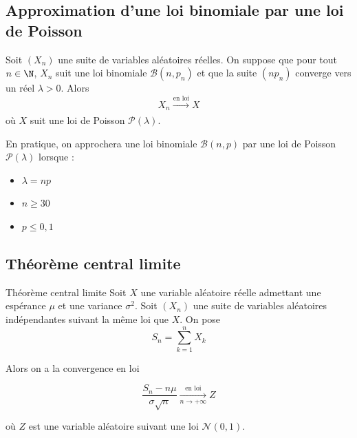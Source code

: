 \subsection{Approximation d'une loi binomiale par une loi de Poisson}
		
\begin{proposition}{}{}
			Soit $(X_n)$ une suite de variables aléatoires réelles. On suppose que pour tout $n \in \N $, $X_n$ suit une loi binomiale $\mathcal{B}(n,p_n)$ et que la suite $(np_n)$ converge vers un réel $\lambda >0$. Alors $$ X_n \xrightarrow[]{\text{en loi}}X $$ où  $X$ suit une loi de Poisson $\mathcal{P}(\lambda)$.
\end{proposition}
		
		En pratique, on approchera une loi binomiale  $\mathcal{B}(n,p)$ par une loi de Poisson $\mathcal{P}(\lambda)$ lorsque :
		
		\begin{itemize}
			\item $\lambda = np$
			\item $n \geq 30$
			\item $p \leq 0{,}1$
		\end{itemize}
		

		
		
\subsection{Théorème central limite}
		
\begin{theoreme}{Théorème central limite}{}
			Soit $X$ une variable aléatoire réelle admettant une espérance $\mu$ et une variance $\sigma^2$. Soit $(X_n)$ une suite de variables aléatoires indépendantes suivant la même loi que $X$. On pose 
			$$S_n=\sum_{k=1}^n X_k$$
			
			Alors on a la convergence en loi 
			
			$$\frac{S_n-n\mu}{\sigma \sqrt{n}}  \xrightarrow[n \to +\infty]{\text{en loi}}Z$$
			
			où $Z$ est une variable aléatoire suivant une loi $\mathcal{N}(0,1)$.
		\end{theoreme}
	

	

		
